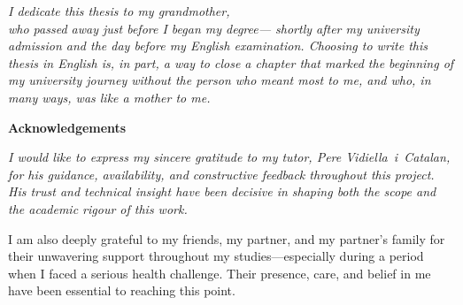 \thispagestyle{empty}
\null\vfill
\begin{flushright}
\begin{minipage}{0.62\textwidth}
\textit{I dedicate this thesis to my grandmother,\\
who passed away just before I began my degree---
shortly after my university admission
and the day before my English examination.
Choosing to write this thesis in English is,
in part, a way to close a chapter
that marked the beginning of my university journey
without the person who meant most to me,
and who, in many ways, was like a mother to me.}
\end{minipage}
\end{flushright}
\vfill\null\newpage

\thispagestyle{empty}
\null\vfill
\begin{flushright}
\begin{minipage}{0.62\textwidth}
{\normalfont\large\bfseries Acknowledgements}\\[0.8em]
{\itshape
I would like to express my sincere gratitude to my tutor,
Pere Vidiella~i~Catalan, for his guidance, availability,
and constructive feedback throughout this project.
His trust and technical insight have been decisive in shaping
both the scope and the academic rigour of this work.

\medskip
I am also deeply grateful to my friends, my partner, and my partner's
family for their unwavering support throughout my studies---especially
during a period when I faced a serious health challenge.
Their presence, care, and belief in me have been essential to
reaching this point.

}
\end{minipage}
\end{flushright}
\vfill\null\cleardoublepage
